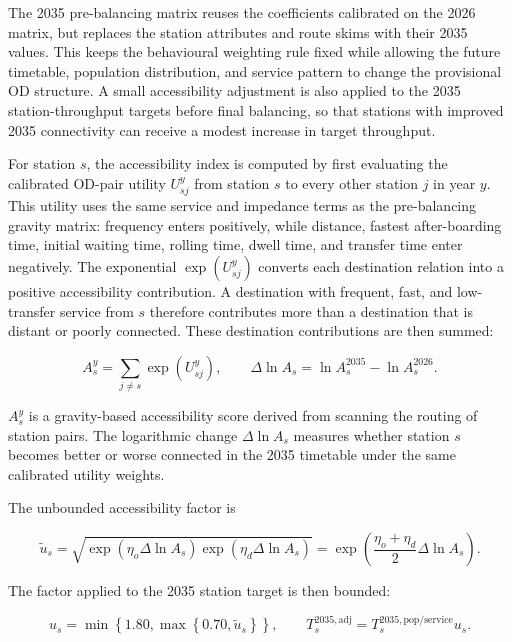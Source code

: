 \documentclass[preprint,12pt]{elsarticle}
\begin{document}
The 2035 pre-balancing matrix reuses the coefficients calibrated on the 2026 matrix, but replaces the station attributes and route skims with their 2035 values. This keeps the behavioural weighting rule fixed while allowing the future timetable, population distribution, and service pattern to change the provisional OD structure. A small accessibility adjustment is also applied to the 2035 station-throughput targets before final balancing, so that stations with improved 2035 connectivity can receive a modest increase in target throughput.

For station \(s\), the accessibility index is computed by first evaluating the calibrated OD-pair utility \(U_{sj}^y\) from station \(s\) to every other station \(j\) in year \(y\). This utility uses the same service and impedance terms as the pre-balancing gravity matrix: frequency enters positively, while distance, fastest after-boarding time, initial waiting time, rolling time, dwell time, and transfer time enter negatively. The exponential \(\exp(U_{sj}^y)\) converts each destination relation into a positive accessibility contribution. A destination with frequent, fast, and low-transfer service from \(s\) therefore contributes more than a destination that is distant or poorly connected. These destination contributions are then summed:

\begin{equation}
A_s^y=\sum_{j\ne s}\exp\left(U_{sj}^y\right),
\qquad
\Delta\ln A_s=\ln A_s^{2035}-\ln A_s^{2026}.
\label{eq:part2-accessibility-change}
\end{equation}

\(A_s^y\) is a gravity-based accessibility score derived from scanning the routing of station pairs. The logarithmic change \(\Delta\ln A_s\) measures whether station \(s\) becomes better or worse connected in the 2035 timetable under the same calibrated utility weights.

The unbounded accessibility factor is

\begin{equation}
\widetilde u_s
=
\sqrt{
\exp\left(\eta_o\Delta\ln A_s\right)
\exp\left(\eta_d\Delta\ln A_s\right)
}
=
\exp\left(\frac{\eta_o+\eta_d}{2}\Delta\ln A_s\right).
\label{eq:part2-2035-accessibility-factor-raw}
\end{equation}

The factor applied to the 2035 station target is then bounded:

\begin{equation}
u_s
=
\min\left\{1.80,\max\left\{0.70,\widetilde u_s\right\}\right\},
\qquad
T_s^{2035,\mathrm{adj}}
=
T_s^{2035,\mathrm{pop/service}}u_s.
\label{eq:part2-2035-induced-demand}
\end{equation}
\end{document}
